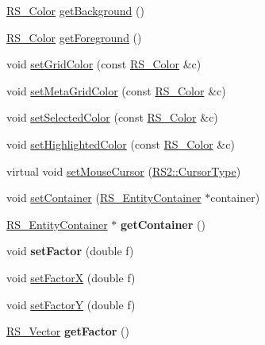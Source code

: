 \begin{DoxyCompactItemize}
\item 
\hyperlink{classRS__Color}{R\-S\-\_\-\-Color} \hyperlink{classRS__GraphicView_ad0daeef68a2d232110b15595a05ce88b}{get\-Background} ()
\item 
\hyperlink{classRS__Color}{R\-S\-\_\-\-Color} \hyperlink{classRS__GraphicView_a84ad946a9e3220c4f8420ba60be1cdb9}{get\-Foreground} ()
\item 
void \hyperlink{classRS__GraphicView_a9c918282d444c1fa7e8d82d995ec4fc0}{set\-Grid\-Color} (const \hyperlink{classRS__Color}{R\-S\-\_\-\-Color} \&c)
\item 
void \hyperlink{classRS__GraphicView_ada125f43b30829898f5bb0a4e9599816}{set\-Meta\-Grid\-Color} (const \hyperlink{classRS__Color}{R\-S\-\_\-\-Color} \&c)
\item 
void \hyperlink{classRS__GraphicView_a77da01e72e2c9dc5c9d191967a20203f}{set\-Selected\-Color} (const \hyperlink{classRS__Color}{R\-S\-\_\-\-Color} \&c)
\item 
void \hyperlink{classRS__GraphicView_a94b7c597e74d76d4d95ee3f0a204c557}{set\-Highlighted\-Color} (const \hyperlink{classRS__Color}{R\-S\-\_\-\-Color} \&c)
\item 
virtual void \hyperlink{classRS__GraphicView_a94f6771b47ea77eb63170100365bfed7}{set\-Mouse\-Cursor} (\hyperlink{classRS2_a15aa1c4c60c63de4dc688f0bcb43548d}{R\-S2\-::\-Cursor\-Type})
\item 
void \hyperlink{classRS__GraphicView_a7ca74d4cb56fbd13a0172f6bca61f018}{set\-Container} (\hyperlink{classRS__EntityContainer}{R\-S\-\_\-\-Entity\-Container} $\ast$container)
\item 
\hypertarget{classRS__GraphicView_adc433841bbafa1b84a8fb34fde3f99d1}{\hyperlink{classRS__EntityContainer}{R\-S\-\_\-\-Entity\-Container} $\ast$ {\bfseries get\-Container} ()}\label{classRS__GraphicView_adc433841bbafa1b84a8fb34fde3f99d1}

\item 
\hypertarget{classRS__GraphicView_a7c69badd067776f46077309a76bbd98a}{void {\bfseries set\-Factor} (double f)}\label{classRS__GraphicView_a7c69badd067776f46077309a76bbd98a}

\item 
void \hyperlink{classRS__GraphicView_a3335bd949a5d10f0725f08c810fc4f09}{set\-Factor\-X} (double f)
\item 
void \hyperlink{classRS__GraphicView_af309a695c17fc2b5eda690cc68370be4}{set\-Factor\-Y} (double f)
\item 
\hypertarget{classRS__GraphicView_a19f6b9a251b30ed6440db935e7912850}{\hyperlink{classRS__Vector}{R\-S\-\_\-\-Vector} {\bfseries get\-Factor} ()}\label{classRS__GraphicView_a19f6b9a251b30ed6440db935e7912850}


\end{DoxyCompactItemize}
